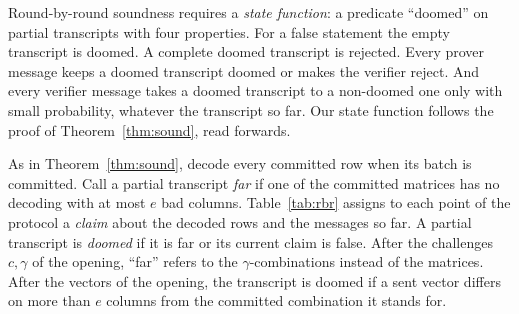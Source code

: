 \documentclass[sigconf,anonymous]{acmart}
\begin{document}
Round-by-round soundness requires a \emph{state function}: a predicate ``doomed'' on partial
transcripts with four properties. For a false statement the empty transcript is doomed. A complete
doomed transcript is rejected. Every prover message keeps a doomed transcript doomed or makes the
verifier reject. And every verifier message takes a doomed transcript to a non-doomed one only with
small probability, whatever the transcript so far. Our state function follows the proof of
Theorem~\ref{thm:sound}, read forwards.

As in Theorem~\ref{thm:sound}, decode every committed row when its batch is committed. Call a partial
transcript \emph{far} if one of the committed matrices has no decoding with at most $e$ bad columns.
Table~\ref{tab:rbr} assigns to each point of the protocol a \emph{claim} about the decoded rows and
the messages so far. A partial transcript is \emph{doomed} if it is far or its current claim is
false. After the challenges $c,\gamma$ of the opening, ``far'' refers to the $\gamma$-combinations
instead of the matrices. After the vectors of the opening, the transcript is doomed if a sent vector
differs on more than $e$ columns from the committed combination it stands for.
\end{document}
